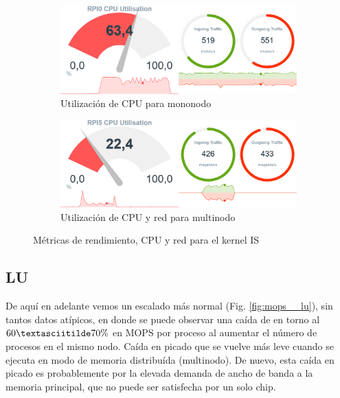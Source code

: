 \begin{figure}[h!]
    \begin{subfigure}[c]{0.9\textwidth}
        \includegraphics[width=\textwidth]{img/benchmark_rev/is_rev_sn.png}
        \caption{Utilización de CPU para mononodo}
        \label{fig:mops_rev_sn__is}
    \end{subfigure}

    \vspace{0.5cm}
    
    \begin{subfigure}[c]{0.9\textwidth}
        \includegraphics[width=\textwidth]{img/benchmark_rev/is_rev_mn.png}
        \caption{Utilización de CPU y red para multinodo}
        \label{fig:mops_rev_mn__is}
    \end{subfigure}
    \caption{Métricas de rendimiento, CPU y red para el kernel IS}
    \label{fig:mops__is}
\end{figure}

\subsection{LU}
\label{ssec:comparacion_resultados__lu}
De aquí en adelante vemos un escalado más normal (Fig. \ref{fig:mops__lu}), sin tantos datos atípicos, en donde se puede observar una caída de en torno al $60\textasciitilde70\%$ en MOPS por proceso al aumentar el número de procesos en el mismo nodo. Caída en picado que se vuelve más leve cuando se ejecuta en modo de memoria distribuída (multinodo). De nuevo, esta caída en picado es probablemente por la elevada demanda de ancho de banda a la memoria principal, que no puede ser satisfecha por un solo chip.

